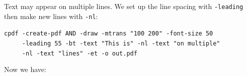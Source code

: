 \documentclass{book}
\begin{document}
\noindent Text may appear on multiple lines. We set up the line spacing with \texttt{-leading} then make new lines with \texttt{-nl}:

\begin{framed}
 \noindent\small\verb?cpdf -create-pdf AND -draw -mtrans "100 200" -font-size 50?\\
 \noindent\small\verb?     -leading 55 -bt -text "This is" -nl -text "on multiple"?\\
 \noindent\small\verb?     -nl -text "lines" -et -o out.pdf?
\end{framed}

\noindent Now we have:

\bigskip
\ifdefined\HCode
{}
\else
{}
\fi
\bigskip
\end{document}
